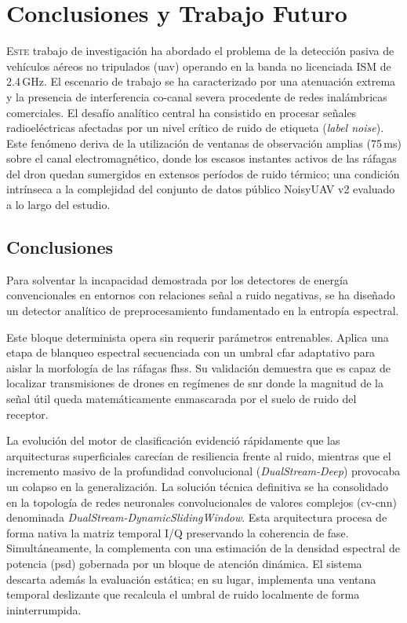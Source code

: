 \chapter{Conclusiones y Trabajo Futuro}
\label{cap:conclusiones}

\lettrine[lraise=-0.1, lines=2, loversize=0.2]{E}{ste} trabajo de investigación ha abordado el problema de la detección pasiva de vehículos aéreos no tripulados (\gls{uav}) operando en la banda no licenciada ISM de 2.4\,GHz. El escenario de trabajo se ha caracterizado por una atenuación extrema y la presencia de interferencia co-canal severa procedente de redes inalámbricas comerciales. El desafío analítico central ha consistido en procesar señales radioeléctricas afectadas por un nivel crítico de ruido de etiqueta (\textit{label noise}). Este fenómeno deriva de la utilización de ventanas de observación amplias (75\,ms) sobre el canal electromagnético, donde los escasos instantes activos de las ráfagas del dron quedan sumergidos en extensos períodos de ruido térmico; una condición intrínseca a la complejidad del conjunto de datos público NoisyUAV v2 evaluado a lo largo del estudio.

\section{Conclusiones}
\label{sec:conclusiones}

Para solventar la incapacidad demostrada por los detectores de energía convencionales en entornos con relaciones señal a ruido negativas, se ha diseñado un detector analítico de preprocesamiento fundamentado en la entropía espectral. 

Este bloque determinista opera sin requerir parámetros entrenables. Aplica una etapa de blanqueo espectral secuenciada con un umbral \gls{cfar} adaptativo para aislar la morfología de las ráfagas \gls{fhss}. Su validación demuestra que es capaz de localizar transmisiones de drones en regímenes de \gls{snr} donde la magnitud de la señal útil queda matemáticamente enmascarada por el suelo de ruido del receptor.

La evolución del motor de clasificación evidenció rápidamente que las arquitecturas superficiales carecían de resiliencia frente al ruido, mientras que el incremento masivo de la profundidad convolucional (\textit{DualStream-Deep}) provocaba un colapso en la generalización. La solución técnica definitiva se ha consolidado en la topología de redes neuronales convolucionales de valores complejos (\gls{cv-cnn}) denominada \textit{DualStream-DynamicSlidingWindow}. Esta arquitectura procesa de forma nativa la matriz temporal I/Q preservando la coherencia de fase. Simultáneamente, la complementa con una estimación de la densidad espectral de potencia (\gls{psd}) gobernada por un bloque de atención dinámica. El sistema descarta además la evaluación estática; en su lugar, implementa una ventana temporal deslizante que recalcula el umbral de ruido localmente de forma ininterrumpida.

